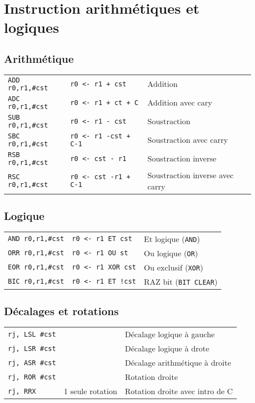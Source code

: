 \documentclass{article}
\begin{document}
\setlength{\columnseprule}{0.5pt}
\section{Instruction arithmétiques et logiques}
\subsection{Arithmétique}
\begin{tabular}{p{3cm}p{3.6cm}l}
	\texttt{ADD r0,r1,\#cst} & \texttt{r0 <- r1 + cst} & Addition\\
	\texttt{ADC r0,r1,\#cst} & \texttt{r0 <- r1 + ct + C} & Addition avec cary\\
	\texttt{SUB r0,r1,\#cst} & \texttt{r0 <- r1 - cst} & Soustraction\\
	\texttt{SBC r0,r1,\#cst} & \texttt{r0 <- r1 -cst + C-1}& Soustraction avec carry\\
	\texttt{RSB r0,r1,\#cst} & \texttt{r0 <- cst - r1}& Soustraction inverse\\
	\texttt{RSC r0,r1,\#cst} & \texttt{r0 <- cst -r1 + C-1}& Soustraction inverse avec carry\\
\end{tabular}
\subsection{Logique}
\begin{tabular}{p{3cm}p{3.6cm}l}
	\texttt{AND r0,r1,\#cst} & \texttt{r0 <- r1 ET cst} & Et logique (\texttt{AND})\\
	\texttt{ORR r0,r1,\#cst} & \texttt{r0 <- r1 OU st} & Ou logique (\texttt{OR})\\
	\texttt{EOR r0,r1,\#cst} & \texttt{r0 <- r1 XOR cst} & Ou exclusif (\texttt{XOR})\\
	\texttt{BIC r0,r1,\#cst} & \texttt{r0 <- r1 ET !cst} & RAZ bit (\texttt{BIT CLEAR})\\
\end{tabular} 
\subsection{Décalages et rotations}
\begin{tabular}{p{3cm}p{3.6cm}l}
	\texttt{rj, LSL \#cst} && Décalage logique à gauche\\
	\texttt{rj, LSR \#cst} && Décalage logique à drote\\
	\texttt{rj, ASR \#cst} && Décalage arithmétique à droite\\
	\texttt{rj, ROR \#cst} && Rotation droite\\
	\texttt{rj, RRX} &\footnotesize{1 seule rotation}& Rotation droite avec intro de C\\
\end{tabular} 
\end{document}
